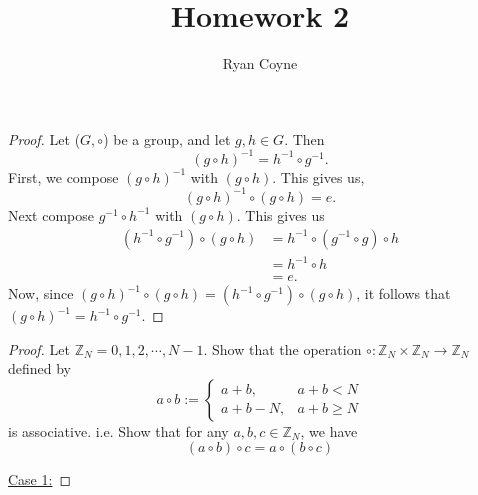 \documentclass[12pt]{article}
\title{Homework 2}
\author{Ryan Coyne}
\def\ZN{\mathbb{Z}_N}
\begin{document}
    \maketitle

    \begin{proof}{Let (\(G, \circ\)) be a group, and let \(g, h\in G\). Then 
        \begin{equation*}
            (g\circ h)^{-1} = h^{-1} \circ g^{-1}.
        \end{equation*}}
        First, we compose \((g \circ h)^{-1}\) with \((g\circ h)\). This gives us, \[(g \circ h)^{-1}\circ(g\circ h) = e.\] Next compose \(g^{-1}\circ h^{-1}\) with \((g\circ h)\). This gives us \begin{align*}
            (h^{-1}\circ g^{-1}) \circ (g\circ h) &= h^{-1} \circ (g^{-1} \circ g) \circ h\\
            & = h^{-1} \circ h\\
            & = e.
        \end{align*}
        Now, since \((g \circ h)^{-1}\circ(g\circ h) = (h^{-1}\circ g^{-1}) \circ (g\circ h)\), it follows that \((g \circ h)^{-1} = h^{-1}\circ g^{-1}\).
    \end{proof}

    \begin{proof}{Let \(\mathbb{Z}_N = {0, 1, 2, \cdots, N-1}\). Show that the operation \(\circ: \mathbb{Z}_N \times \ZN \rightarrow \ZN\) defined by \begin{equation*}
        a \circ b := \begin{cases}
            a + b,  &a + b < N\\
            a + b - N, & a + b \geq N
        \end{cases}
    \end{equation*}
    is associative. i.e. Show that for any \(a, b, c \in \ZN\), we have 
    \begin{equation*}
        (a\circ b) \circ c = a \circ (b \circ c)
    \end{equation*}}
    
    \underline{Case 1:} 
    \end{proof}
\end{document}
